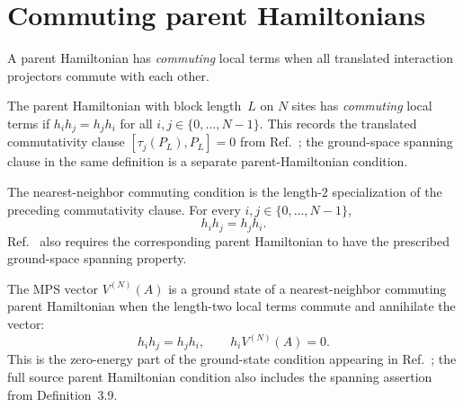 \section{Commuting parent Hamiltonians}\label{sec:commuting_parent_ham}

A parent Hamiltonian has \emph{commuting} local terms when all translated
interaction projectors commute with each other.

\begin{definition}\label{def:is_commuting_parent_ham}
    \leanok
    The parent Hamiltonian with block length~$L$ on $N$ sites has
    \emph{commuting} local terms if
    $h_i h_j = h_j h_i$ for all $i,j \in \{0,\ldots,N{-}1\}$.
    This records the translated commutativity clause
    $[\tau_j(P_L),P_L]=0$ from
    Ref.~\cite[Definition~3.9]{Cirac2016MPDO_arXiv}; the ground-space spanning
    clause in the same definition is a separate parent-Hamiltonian condition.
\end{definition}

\begin{definition}\label{def:is_nncph}
    \leanok
    The nearest-neighbor commuting condition is the length-$2$ specialization
    of the preceding commutativity clause. For every
    $i,j\in\{0,\ldots,N{-}1\}$,
    \[
        h_i h_j=h_j h_i.
    \]
    Ref.~\cite[Definition~3.9]{Cirac2016MPDO_arXiv} also requires the
    corresponding parent Hamiltonian to have the prescribed ground-space
    spanning property.
\end{definition}

\begin{definition}%
    \label{def:is_nncph_ground_state}
    \leanok
    The MPS vector $V^{(N)}(A)$ is a ground state of a nearest-neighbor
    commuting parent Hamiltonian when the length-two local terms commute and
    annihilate the vector:
    \[
        h_i h_j = h_j h_i,\qquad
        h_i V^{(N)}(A)=0.
    \]
    This is the zero-energy part of the ground-state condition appearing in
    Ref.~\cite[Theorem~3.10(iii)]{Cirac2016MPDO_arXiv}; the full source parent
    Hamiltonian condition also includes the spanning assertion from
    Definition~3.9.
\end{definition}

